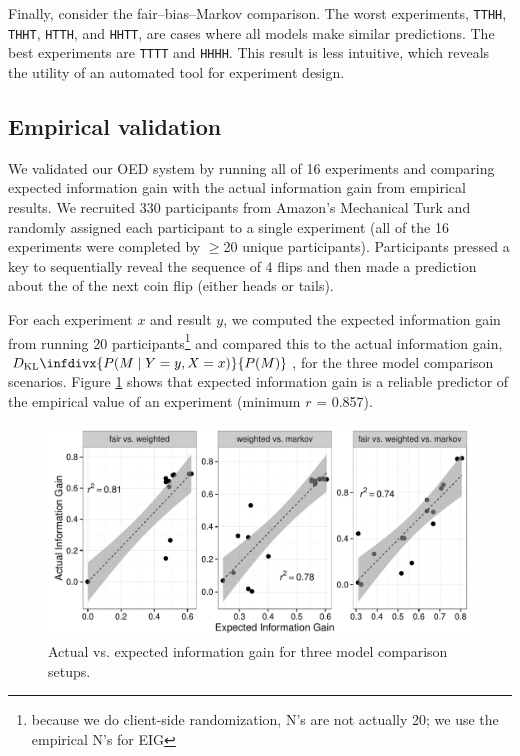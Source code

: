\documentclass{article}
\newcommand{\dkl}{D_\mathrm{KL}\infdivx}
\begin{document}
Finally, consider the fair--bias--Markov comparison.
The worst experiments, \lstinline{TTHH}, \lstinline{THHT}, \lstinline{HTTH}, and \lstinline{HHTT}, are cases where all models make similar predictions.
The best experiments are \lstinline{TTTT} and \lstinline{HHHH}.
This result is less intuitive, which reveals the utility of an automated tool for experiment design.



\subsection{Empirical validation}
We validated our OED system by running all of 16 experiments and comparing expected information gain with the actual information gain from empirical results.
We recruited 330 participants from Amazon's Mechanical Turk and randomly assigned each participant to a single experiment (all of the 16 experiments were completed by $\geq$20 unique participants).
Participants pressed a key to sequentially reveal the sequence of 4 flips and then made a prediction about the of the next coin flip (either heads or tails).

For each experiment $x$ and result $y$, we computed the expected information gain from running 20 participants\footnote{because we do client-side randomization, N's are not actually 20; we use the empirical N's for EIG} and compared this to the actual information gain, $\dkl{P(M \mid Y = y, X = x)}{P(M)}$, for the three model comparison scenarios.
Figure \ref{fig:aig_vs_eig} shows that expected information gain is a reliable predictor of the empirical value of an experiment (minimum $r$ = 0.857).

\begin{figure}[t]
\centering
\includegraphics[width=0.7\columnwidth]{img/coin_eig_aig_scatter_noText.pdf}
\caption{Actual vs. expected information gain for three model comparison setups.}
\label{fig:aig_vs_eig}
\end{figure}
\end{document}
